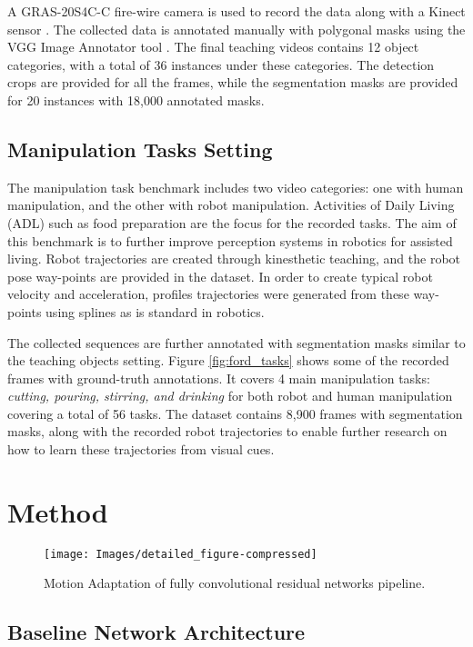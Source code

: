 \documentclass[letterpaper, 10 pt, conference]{ieeeconf}
\begin{document}
A GRAS-20S4C-C fire-wire camera is used to record the data along with a Kinect sensor \cite{steward2015performance}. The collected data is annotated manually with polygonal masks using the VGG Image Annotator tool \cite{dutta2016via}. The final teaching videos contains 12 object categories, with a total of 36 instances under these categories. The detection crops are provided for all the frames, while the segmentation masks are provided for 20 instances with  18,000 annotated masks.

\subsection{Manipulation Tasks Setting}
The manipulation task benchmark includes two video categories: one with human manipulation, and the other with robot manipulation. Activities of Daily Living (ADL) such as food preparation are the focus for the recorded tasks. The aim of this benchmark is to further improve perception systems in robotics for assisted living. Robot trajectories are created through kinesthetic teaching, and the robot pose way-points are provided in the dataset. In order to create typical robot velocity and acceleration, profiles trajectories were generated from these way-points using splines as is standard in robotics.

The collected sequences are further annotated with segmentation masks similar to the teaching objects setting. Figure \ref{fig:ford_tasks} shows some of the recorded frames with ground-truth annotations. It covers 4 main manipulation tasks: \textit{cutting, pouring, stirring, and drinking} for both robot and human manipulation covering a total of 56 tasks. The dataset contains  8,900 frames with segmentation masks, along with the recorded robot trajectories to enable further research on how to learn these trajectories from visual cues. 
\section{Method}
\begin{figure*}[ht!]
	\centering
    \texttt{[image: Images/detailed\_figure-compressed]}
    \caption{Motion Adaptation of fully convolutional residual networks pipeline.}
    \label{fig:details}
\end{figure*}

\subsection{Baseline Network Architecture}
\label{sec:baseline}
\end{document}
